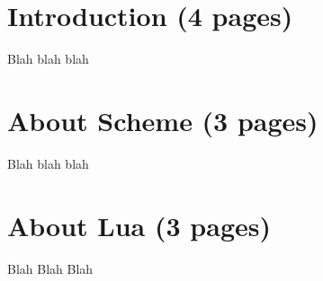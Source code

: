 \section{Introduction (4 pages)}
Blah blah blah

\section{About Scheme (3 pages)}
Blah blah blah

\section{About Lua (3 pages)}
Blah Blah Blah
